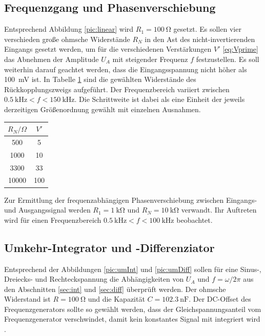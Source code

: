 \subsection{Frequenzgang und Phasenverschiebung}
Entsprechend Abbildung \ref{pic:linear} wird $R_1 = \SI{100}{\ohm}$
gesetzt. Es sollen vier verschieden große ohmsche Widerstände $R_N$ in den Ast des nicht-invertierenden Eingangs gesetzt werden, um für
die verschiedenen Verstärkungen $V'$ \eqref{eq:Vprime} das 
Abnehmen der Amplitude $U_A$
mit steigender Frequenz $f$ festzustellen. Es soll weiterhin
darauf geachtet werden, dass die Eingangsspannung nicht höher als
\SI{100}{\milli\volt} ist. In Tabelle \ref{tab:verstaerkungen} sind
die gewählten Widerstände des Rückkopplungszweigs aufgeführt. Der
Frequenzbereich variiert zwischen $\SI{0.5}{\kilo\hertz} < f < \SI{150}{\kilo\hertz}$. Die Schrittweite ist dabei als eine Einheit der jeweils
derzeitigen Größenordnung gewählt mit einzelnen Ausnahmen.
\begin{table}[b]
 \begin{tabular}{c|c}
  $R_N/\Omega$ & $V'$\\
  \hline
  500 & 5\\
  1000 & 10 \\
  3300 & 33 \\
  10000 & 100
 \end{tabular}
\label{tab:verstaerkungen}
\end{table}
Zur Ermittlung der frequenzabhängigen Phasenverschiebung zwischen Eingangs- und Ausgangssignal
werden $R_1 = \SI{1}{\kilo\ohm}$ und $R_N = \SI{10}{\kilo\ohm}$ 
verwandt. Ihr Auftreten wird für einen Frequenzbereich 
$\SI{0.5}{\kilo\hertz} < f < \SI{100}{\kilo\hertz}$ beobachtet.

\subsection{Umkehr-Integrator und -Differenziator}
Entsprechend der Abbildungen \ref{pic:umInt} und \ref{pic:umDiff}
sollen für eine Sinus-, Dreiecks- und Rechteckspannung die Abhängigkeiten
von $U_A$ und $f=\omega/2\pi$ aus den Abschnitten \ref{sec:int} und
\ref{sec:diff} überprüft werden. Der ohmsche Widerstand ist
$R = \SI{100}{\ohm}$ und die Kapazität $C = \SI{102,3}{\nano\farad}$.
Der DC-Offset des Frequenzgenerators sollte so gewählt werden, dass der Gleichspannungsanteil
vom Frequenzgenerator verschwindet, damit kein konstantes Signal
mit integriert wird \cite{Anl}.

